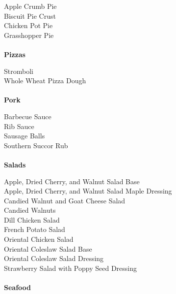 \documentclass[11pt, twoside, openany]{book}
\begin{document}
Apple Crumb Pie\hrulefill\pageref{apple-crumb-pie}\\
Biscuit Pie Crust\hrulefill\pageref{biscuit-pie-crust}\\
Chicken Pot Pie\hrulefill\pageref{chicken-pot-pie}\\
Grasshopper Pie\hrulefill\pageref{grasshopper-pie}\\
{~\vspace{2mm}\\ \Large \textbf{Pizzas}}\hfill\textbf{\pageref{pizzas}}

Stromboli\hrulefill\pageref{stromboli}\\
Whole Wheat Pizza Dough\hrulefill\pageref{whole-wheat-pizza-dough}\\
{~\vspace{2mm}\\ \Large \textbf{Pork}}\hfill\textbf{\pageref{pork}}

Barbecue Sauce\hrulefill\pageref{barbecue-sauce}\\
Rib Sauce\hrulefill\pageref{rib-sauce}\\
Sausage Balls\hrulefill\pageref{sausage-balls}\\
Southern Succor Rub\hrulefill\pageref{southern-succor-rub}\\
{~\vspace{2mm}\\ \Large \textbf{Salads}}\hfill\textbf{\pageref{salads}}

Apple, Dried Cherry, and Walnut Salad Base\hrulefill\pageref{apple,-dried-cherry,-and-walnut-salad-base}\\
Apple, Dried Cherry, and Walnut Salad Maple Dressing\hrulefill\pageref{apple,-dried-cherry,-and-walnut-salad-maple-dressing}\\
Candied Walnut and Goat Cheese Salad\hrulefill\pageref{candied-walnut-and-goat-cheese-salad}\\
Candied Walnuts\hrulefill\pageref{candied-walnuts}\\
Dill Chicken Salad\hrulefill\pageref{dill-chicken-salad}\\
French Potato Salad\hrulefill\pageref{french-potato-salad}\\
Oriental Chicken Salad\hrulefill\pageref{oriental-chicken-salad}\\
Oriental Coleslaw Salad Base\hrulefill\pageref{oriental-coleslaw-salad-base}\\
Oriental Coleslaw Salad Dressing\hrulefill\pageref{oriental-coleslaw-salad-dressing}\\
Strawberry Salad with Poppy Seed Dressing\hrulefill\pageref{strawberry-salad-with-poppy-seed-dressing}\\
{~\vspace{2mm}\\ \Large \textbf{Seafood}}\hfill\textbf{\pageref{seafood}}
\end{document}
